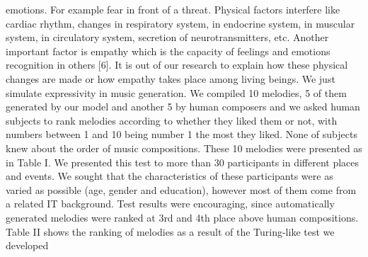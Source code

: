 emotions. For example fear in front of a threat. Physical factors interfere like cardiac rhythm, changes in respiratory system, in endocrine system, in muscular system, in circulatory system, secretion of neurotransmitters, etc. Another important factor is empathy which is the capacity of feelings and emotions recognition in others [6]. It is out of our research to explain how these physical changes are made or how empathy takes place among living beings. We just simulate expressivity in music generation. We compiled 10 melodies, 5 of them generated by our model and another 5 by human composers and we asked human subjects to rank melodies according to whether they liked them or not, with numbers between 1 and 10 being number 1 the most they liked. None of subjects knew about the order of music compositions. These 10 melodies were presented as in Table I. We presented this test to more than 30 participants in different places and events. We sought that the characteristics of these participants were as varied as possible (age, gender and education), however most of them come from a related IT background. Test results were encouraging, since automatically generated melodies were ranked at 3rd and 4th place above human compositions. Table II shows the ranking of melodies as a result of the Turing-like test we developed

